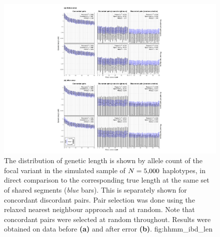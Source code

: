 

\begin{figure}[!htb]
\includegraphics[width=\textwidth]{./img/ch5/hhmm_ibd_len}
{The distribution of genetic length is shown by allele count of the focal variant in the simulated sample of ${N=\n{5000}}$ haplotypes, in direct comparison to the corresponding true length at the same set of shared segments (\emph{blue} bars).
This is separately shown for concordant discordant pairs.
Pair selection was done using the relaxed nearest neighbour approach and at random.
Note that concordant pairs were selected at random throughout.
Results were obtained on data before \textbf{(a)} and after error \textbf{(b)}.}
{fig:hhmm_ibd_len}
\end{figure}

